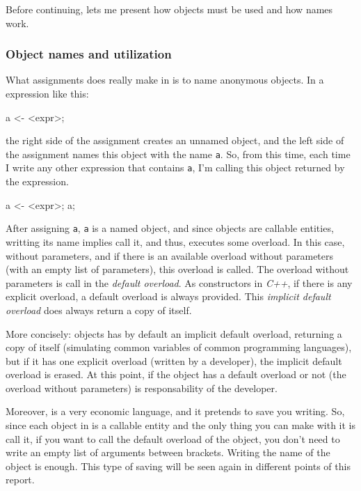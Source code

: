 \documentclass{article}
\begin{document}
Before continuing, lets me present how objects must be used and how names
work.

\subsubsection{Object names and utilization}
What assignments does really make in \faupp is to name anonymous objects. In a
expression like this:

\begin{faupp2}
  a <- <expr>;
\end{faupp2}

the right side of the assignment creates an unnamed object, and the left side of
the assignment names this object with the name \texttt{a}. So, from this time,
each time I write any other expression that contains \texttt{a}, I'm calling
this object returned by the expression.

\begin{faupp2}
  a <- <expr>;
  a;
\end{faupp2}

After assigning \texttt{a}, \texttt{a} is a named object, and since objects are
callable entities, writting its name implies call it, and thus, executes some
overload. In this case, without parameters, and if there is an available
overload without parameters (with an empty list of parameters), this overload is
called. The overload without parameters is call in \faupp the \textit{default
  overload}. As constructors in \textit{C++}, if there is any explicit overload,
a default overload is always provided. This \textit{implicit default overload}
does always return a copy of itself.

More concisely: objects has by default an implicit default overload, returning a
copy of itself (simulating common variables of common programming languages),
but if it has one explicit overload (written by a developer), the implicit
default overload is erased. At this point, if the object has a default overload
or not (the overload without parameters) is responsability of the developer.

Moreover, \faupp is a very economic language, and it pretends to save you
writing. So, since each object in \faupp is a callable entity and the only
thing you can make with it is call it, if you want to call the default overload
of the object, you don't need to write an empty list of arguments between
brackets. Writing the name of the object is enough. This type of saving will be
seen again in different points of this report.
\end{document}
